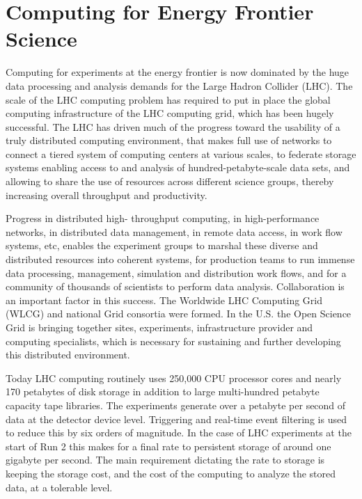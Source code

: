 
\section{Computing for Energy Frontier Science}

Computing for experiments at the energy frontier is now dominated by the huge data
processing and analysis demands for the Large Hadron Collider (LHC). The scale
of the LHC computing problem has required to put in place the global computing
infrastructure of the LHC computing grid, which has been hugely successful. 
The LHC
has driven much of the progress toward the usability of a truly distributed
computing environment, that makes full use of networks to connect a tiered
system of computing centers at various scales, to federate storage systems
enabling access to and analysis of hundred-petabyte-scale data sets, and
allowing to share the use of resources across different science groups, thereby
increasing overall throughput and productivity. 

Progress in distributed high- throughput computing, in high-performance
networks, in distributed data management, in remote data access, in work flow
systems, etc, enables the experiment groups to marshal these diverse
and distributed resources into coherent systems, for production teams to run
immense data processing, management, simulation and distribution work flows,
and for a community of thousands of scientists to perform data analysis.
Collaboration is an important factor in this success. The Worldwide LHC
Computing Grid (WLCG)  and national Grid consortia were formed. In the U.S.
the Open Science Grid is  bringing together sites, experiments, infrastructure
provider and computing specialists, which is necessary for 
sustaining and further developing this distributed environment.

Today LHC computing routinely uses 250,000 CPU processor cores and nearly 170
petabytes of disk storage in addition to large multi-hundred petabyte capacity
tape libraries.  The experiments generate over a petabyte per second of data
at the detector device level. Triggering and real-time event filtering  is
used to reduce this by six orders of magnitude. In the case of LHC experiments
at the start of Run 2 this makes for a final rate to persistent storage of
around one gigabyte per second. The main requirement dictating the rate to
storage is keeping the storage cost, and the  cost of the computing to analyze
the stored data, at a tolerable level.


